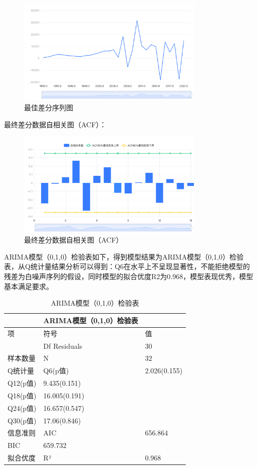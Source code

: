 \documentclass[12pt, a4paper, oneside]{ctexart}
\begin{document}
\begin{figure}[H]
  \centering
  \includegraphics[width=0.8\textwidth]{pic/最佳差分序列图.png}
  \caption{最佳差分序列图}
  \label{fig:最佳差分序列图}
\end{figure}



最终差分数据自相关图（ACF）：

\begin{figure}[H]
  \centering
  \includegraphics[width=0.8\textwidth]{pic/最终差分数据自相关图（ACF） (1).png}
  \caption{最终差分数据自相关图（ACF）}
  \label{fig:ACF}
\end{figure}


ARIMA模型（0,1,0）检验表如下，得到模型结果为ARIMA模型（0,1,0）检验表，从Q统计量结果分析可以得到：Q6在水平上不呈现显著性，不能拒绝模型的残差为白噪声序列的假设，同时模型的拟合优度R2为0.968，模型表现优秀，模型基本满足要求。

\begin{table}[H]
  \centering
  \begin{tabularx}{0.9\textwidth}{XXX}
  \toprule
  & ARIMA模型（0,1,0）检验表 & \\
  \midrule
  项 & 符号 & 值 \\
  & Df Residuals & 30 \\
  样本数量 & N & 32 \\
  Q统计量 & Q6(p值) & 2.026(0.155) \\
  Q12(p值) & 9.435(0.151) & \\
  Q18(p值) & 16.005(0.191) & \\
  Q24(p值) & 16.657(0.547) & \\
  Q30(p值) & 17.06(0.846) & \\
  信息准则 & AIC & 656.864 \\
  BIC & 659.732 & \\
  拟合优度 & R² & 0.968 \\
  \bottomrule
  \end{tabularx}
  \caption{ARIMA模型（0,1,0）检验表}
  \label{tab:arima}
\end{table}
\end{document}
